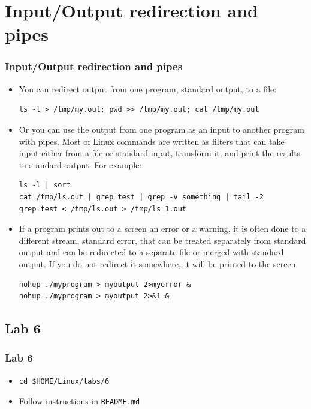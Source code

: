 \documentclass{beamer}
\begin{document}
\section{Input/Output redirection and pipes}
\begin{frame}[fragile]
  \frametitle{Input/Output redirection and pipes}
\begin{itemize}
\item You can {\color{mycolordef}redirect} output from one program, {\color{mycolordef}standard output}, to a file:
{\color{mycolorcli}
\begin{verbatim}
ls -l > /tmp/my.out; pwd >> /tmp/my.out; cat /tmp/my.out
\end{verbatim}
}
\item Or you can use the output from one program as an input to another program with {\color{mycolordef}pipes}. 
Most of Linux commands are written as filters that can take input either from a file or {\color{mycolordef}standard input}, transform it, and print the results to standard output. For example:
{\color{mycolorcli}
\begin{verbatim}
ls -l | sort
cat /tmp/ls.out | grep test | grep -v something | tail -2
grep test < /tmp/ls.out > /tmp/ls_1.out
\end{verbatim}
}
\item If a program prints out to a screen an error or a warning, it is often done to a different stream,  {\color{mycolordef}standard error}, that can be treated separately from standard output and can be redirected to a separate file
or merged with standard output. If you do not redirect it somewhere, it will be printed to the screen.
{\color{mycolorcli}
\begin{verbatim}
nohup ./myprogram > myoutput 2>myerror &
nohup ./myprogram > myoutput 2>&1 &
\end{verbatim}
}
\end{itemize}
\end{frame}


\subsection{Lab 6}
\begin{frame}[fragile]
  \frametitle{Lab 6}
\begin{itemize}
\item
{\color{mycolorcli}
\begin{verbatim}
cd $HOME/Linux/labs/6
\end{verbatim}
}
\item Follow instructions in {\color{mycolorcli}\verb|README.md|}
\end{itemize}

\end{frame}
\end{document}
